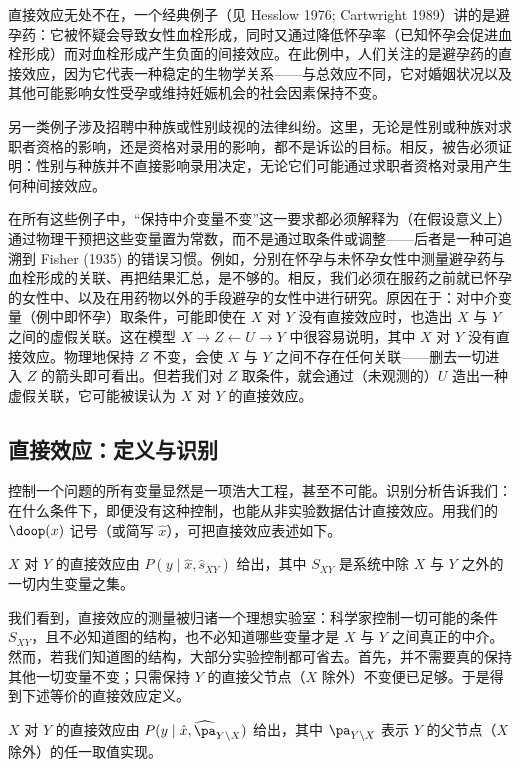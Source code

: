 直接效应无处不在，一个经典例子（见 Hesslow 1976; Cartwright 1989）讲的是避孕药：它被怀疑会导致女性血栓形成，同时又通过降低怀孕率（已知怀孕会促进血栓形成）而对血栓形成产生负面的间接效应。在此例中，人们关注的是避孕药的直接效应，因为它代表一种稳定的生物学关系——与总效应不同，它对婚姻状况以及其他可能影响女性受孕或维持妊娠机会的社会因素保持不变。

另一类例子涉及招聘中种族或性别歧视的法律纠纷。这里，无论是性别或种族对求职者资格的影响，还是资格对录用的影响，都不是诉讼的目标。相反，被告必须证明：性别与种族并不直接影响录用决定，无论它们可能通过求职者资格对录用产生何种间接效应。

在所有这些例子中，“保持中介变量不变”这一要求都必须解释为（在假设意义上）通过物理干预把这些变量置为常数，而不是通过取条件或调整——后者是一种可追溯到 Fisher (1935) 的错误习惯。例如，分别在怀孕与未怀孕女性中测量避孕药与血栓形成的关联、再把结果汇总，是不够的。相反，我们必须在服药之前就已怀孕的女性中、以及在用药物以外的手段避孕的女性中进行研究。原因在于：对中介变量（例中即怀孕）取条件，可能即使在 $X$ 对 $Y$ 没有直接效应时，也造出 $X$ 与 $Y$ 之间的虚假关联。这在模型 $X\to Z\leftarrow U\to Y$ 中很容易说明，其中 $X$ 对 $Y$ 没有直接效应。物理地保持 $Z$ 不变，会使 $X$ 与 $Y$ 之间不存在任何关联——删去一切进入 $Z$ 的箭头即可看出。但若我们对 $Z$ 取条件，就会通过（未观测的）$U$ 造出一种虚假关联，它可能被误认为 $X$ 对 $Y$ 的直接效应。

\subsection{直接效应：定义与识别}

控制一个问题的所有变量显然是一项浩大工程，甚至不可能。识别分析告诉我们：在什么条件下，即便没有这种控制，也能从非实验数据估计直接效应。用我们的 $\doop(x)$ 记号（或简写 $\hat{x}$），可把直接效应表述如下。

\begin{definition}[直接效应]
$X$ 对 $Y$ 的直接效应由 $P(y\mid\hat{x},\hat{s}_{XY})$ 给出，其中 $S_{XY}$ 是系统中除 $X$ 与 $Y$ 之外的一切内生变量之集。
\end{definition}

我们看到，直接效应的测量被归诸一个理想实验室：科学家控制一切可能的条件 $S_{XY}$，且不必知道图的结构，也不必知道哪些变量才是 $X$ 与 $Y$ 之间真正的中介。然而，若我们知道图的结构，大部分实验控制都可省去。首先，并不需要真的保持其他一切变量不变；只需保持 $Y$ 的直接父节点（$X$ 除外）不变便已足够。于是得到下述等价的直接效应定义。

\begin{corollary}
$X$ 对 $Y$ 的直接效应由 $P(y\mid\hat{x},\widehat{\pa}_{Y\backslash X})$ 给出，其中 $\pa_{Y\backslash X}$ 表示 $Y$ 的父节点（$X$ 除外）的任一取值实现。
\end{corollary}


